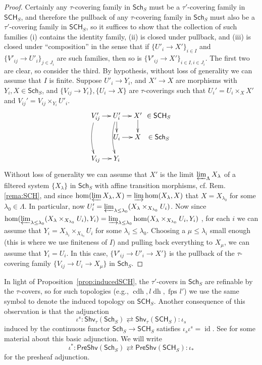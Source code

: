 \documentclass[10pt]{amsart}
\theoremstyle{definition}
\DeclareMathOperator{\id}{id}
\newcommand{\PreShv}{\mathsf{PreShv}}
\newcommand{\Shv}{\mathsf{Shv}}
\newcommand{\Sch}{\mathsf{Sch}}
\newcommand{\SCH}{\mathsf{SCH}}
\newcommand{\fpsl}{{\operatorname{fps\!}l'}}
\newcommand{\cdh}{{{\operatorname{cdh}}}}
\newcommand{\ldh}{{l{\operatorname{dh}}}}
\begin{document}
\begin{proof}
Certainly any $\tau$-covering family in $\Sch_S$ must be a $\tau'$-covering family in $\SCH_S$, and therefore the pullback of any $\tau$-covering family in $\Sch_S$ must also be a $\tau'$-covering family in $\SCH_S$, so it suffices to show that the collection of such families (i) contains the identity family, (ii) is closed under pullback, and (iii) is closed under ``composition'' in the sense that if $\{U'_i \to X'\}_{i \in I}$ and $\{V'_{ij} \to U'_i\}_{j \in J_i}$ are such families, then so is $\{V'_{ij} \to X'\}_{i \in I, i \in J_i}$. The first two are clear, so consider the third. By hypothesis, without loss of generality we can assume that $I$ is finite. Suppose $U'_i \to Y_i$, and $X' \to X$ are morphisms with $Y_i, X \in \Sch_S$, and $\{V_{ij} \to Y_i\}, \{U_i \to X\}$ are $\tau$-coverings such that $U_i' = U_i \times_X X'$ and $V_{ij}' = V_{ij} \times_{Y_i} U'_i$. 
\[ \xymatrix@!=6pt{
V_{ij}' \ar[r] \ar@/_6pt/[dd] & U_i' \ar[r] \ar@/_6pt/[dd] \ar[d] & X' \ar[d] & \in \SCH_S\\
&  U_i \ar[r] & X & \in \Sch_S \\
V_{ij} \ar[r] & Y_i 
} \]
Without loss of generality we can assume that $X'$ is the limit $\varprojlim_{\Lambda} X_\lambda$ of a filtered system $\{X_\lambda\}$ in $\Sch_S$ with affine transition morphisms, cf. Rem.\ref{rema:SCH}, and since $\hom(\varprojlim X_\lambda, X) = \varinjlim \hom(X_\lambda, X)$ \cite[Cor.8.13.2]{EGAIV3} that $X = X_{\lambda_0}$ for some $\lambda_0 \in \Lambda$. In particular, now $U_i' = \varprojlim_{\lambda \leq \lambda_0} (X_\lambda \times_{X_{\lambda_0}} U_i)$. Now since $\hom(\varprojlim_{\lambda \leq \lambda_0} (X_\lambda \times_{X_{\lambda_0}} U_i), Y_i) = \varinjlim_{\lambda \leq \lambda_0} \hom(X_\lambda \times_{X_{\lambda_0}} U_i, Y_i)$ \cite[Cor.8.13.2]{EGAIV3}, for each $i$ we can assume that $Y_i = X_{\lambda_i} \times_{X_{\lambda_0}} U_i$ for some $\lambda_i \leq \lambda_0$. Choosing a $\mu \leq \lambda_i$ small enough (this is where we use finiteness of $I$) and pulling back everything to $X_\mu$, we can assume that $Y_i = U_i$. In this case, $\{V'_{ij} \to U'_i \to X'\}$ is the pullback of the $\tau$-covering family $\{V_{ij} \to U_i \to X_\mu\}$ in $\Sch_S$.
\end{proof}

In light of Proposition~\ref{prop:inducedSCH}, the $\tau'$-covers in $\Sch_S$ are refinable by the $\tau$-covers, so for such topologies (e.g., $\cdh, \ldh, \fpsl$) we use the same symbol to denote the induced topology on $\SCH_S$. Another consequence of this observation is that the adjunction
\[ \iota^s: \Shv_\tau(\Sch_S) \rightleftarrows \Shv_\tau(\SCH_S): \iota_s \]
induced by the continuous functor $\Sch_S {\to} \SCH_S$ satisfies $\iota_s\iota^s = \id$. See \cite[Expos{\'e} 3]{SGA4} for some material about this basic adjunction. We will write 
\[ \iota^*: \PreShv(\Sch_S) \rightleftarrows \PreShv(\SCH_S): \iota_* \]
for the presheaf adjunction.
\end{document}

